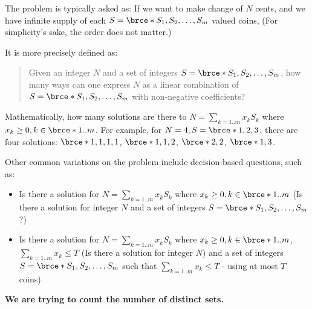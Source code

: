 
The problem is typically asked as: If we want to make change of $N$ cents,
and we have infinite supply of each $S=\brce*{S_1,S_2,\ldots,S_m}$ valued
coins,  (For simplicity's sake,
the order does not matter.)

It is more precisely defined as:
\begin{quotation}
Given an integer $N$ and a set of integers $S=\brce*{S_1,S_2,\ldots,S_m}$,
how many ways can one express $N$ as a linear combination of
$S=\brce*{S_1,S_2,\ldots,S_m}$ with non-negative coefficients? 
\end{quotation}
Mathematically, how many solutions are there to $N=\sum_{k=1..m}x_kS_k$
where $x_k\geq0, k\in\brce*{1..m}$.  For example, for $N=4,
S=\brce*{1,2,3}$, there are four solutions: $\brce*{1,1,1,1}$,
$\brce*{1,1,2}$, $\brce*{2,2}$, $\brce*{1,3}$.

Other common variations on the problem include decision-based questions,
such as:
\begin{itemize}%
\item Is there a solution for $N=\sum_{k=1..m}x_kS_k$ where $x_k\geq0,
  k\in\brce*{1..m}$ (Is there a solution for integer $N$ and a set of
  integers $S=\brce*{S_1,S_2,\ldots,S_m}$?) 
\item Is there a solution for $N =\sum_{k=1..m}x_kS_k$ where
  $x_k\geq0,k\in\brce*{1..m}$, $\sum_{k=1..m}x_k\leq T$ (Is there a solution
  for integer $N$) and a set of integers $S=\brce*{S_1,S_2,\ldots,S_m}$ such
  that $\sum_{k=1..m}x_k\leq T$ - using at most $T$ coins)
\end{itemize}


\textbf{We are trying to count the number of distinct sets.}

